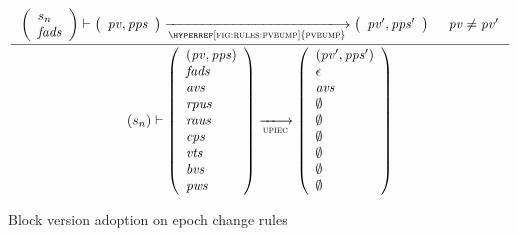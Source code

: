 \begin{figure}[htb]
\begin{equation}
    \inference
    {
      {\left(\begin{array}{l}
         s_n\\
         \var{fads}
       \end{array}\right)}
      \vdash
      {
        \left(
          \begin{array}{l}
            \var{pv}, \var{pps}\\
          \end{array}
        \right)
      }
      \trans{\hyperref[fig:rules:pvbump]{pvbump}}{}
      {
        \left(
          \begin{array}{l}
            \var{pv'}, \var{pps'}\\
          \end{array}
        \right)
      }
      & \var{pv} \neq \var{pv'}
    }
    {
      (s_n)
      \vdash
      {
        \left(
          \begin{array}{l}
            \var{(\var{pv}, \var{pps})}\\
            \var{fads}\\
            \var{avs}\\
            \var{rpus}\\
            \var{raus}\\
            \var{cps}\\
            \var{vts}\\
            \var{bvs}\\
            \var{pws}
          \end{array}
        \right)
      }
      \trans{upiec}{}
      {
        \left(
          \begin{array}{l}
            (\var{pv'}, \var{pps'})\\
            \epsilon\\
            \var{avs}\\
            \emptyset\\
            \emptyset\\
            \emptyset\\
            \emptyset\\
            \emptyset\\
            \emptyset\\
          \end{array}
        \right)
      }
    }
  \end{equation}
  \caption{Block version adoption on epoch change rules}
  \label{fig:rules:upi-ec}
\end{figure}

